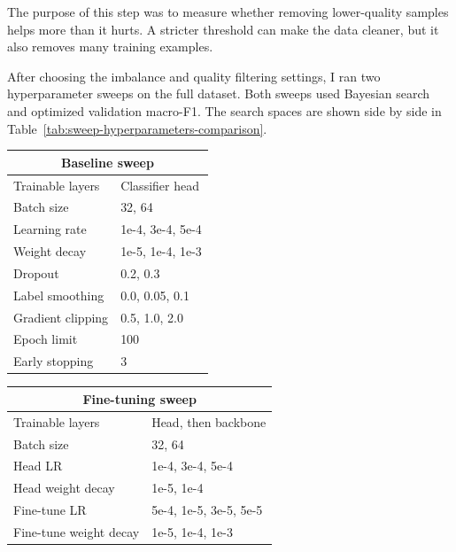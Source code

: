 The purpose of this step was to measure whether removing lower-quality samples helps more than it hurts. A stricter threshold can make the data cleaner, but it also removes many training examples.

After choosing the imbalance and quality filtering settings, I ran two hyperparameter sweeps on the full dataset. Both sweeps used Bayesian search and optimized validation macro-F1. The search spaces are shown side by side in Table~\ref{tab:sweep-hyperparameters-comparison}.

\begin{table}[h]
    \centering
    \small
    \begin{minipage}{0.48\textwidth}
        \centering
        \begin{tabular}{ll}
            \hline
            \multicolumn{2}{c}{Baseline sweep} \\
            \hline
            Trainable layers & Classifier head \\
            Batch size & 32, 64 \\
            Learning rate & 1e-4, 3e-4, 5e-4 \\
            Weight decay & 1e-5, 1e-4, 1e-3 \\
            Dropout & 0.2, 0.3 \\
            Label smoothing & 0.0, 0.05, 0.1 \\
            Gradient clipping & 0.5, 1.0, 2.0 \\
            Epoch limit & 100 \\
            Early stopping & 3 \\
            \hline
        \end{tabular}
    \end{minipage}
    \hfill
    \begin{minipage}{0.48\textwidth}
        \centering
        \begin{tabular}{ll}
            \hline
            \multicolumn{2}{c}{Fine-tuning sweep} \\
            \hline
            Trainable layers & Head, then backbone \\
            Batch size & 32, 64 \\
            Head LR & 1e-4, 3e-4, 5e-4 \\
            Head weight decay & 1e-5, 1e-4 \\
            Fine-tune LR & 5e-4, 1e-5, 3e-5, 5e-5 \\
            Fine-tune weight decay & 1e-5, 1e-4, 1e-3 \\

\end{tabular}
\end{minipage}
\end{table}
